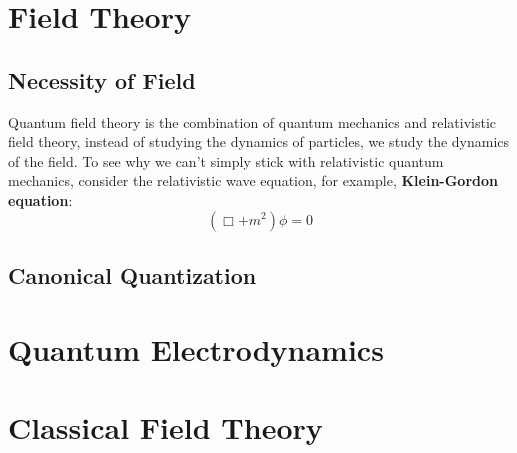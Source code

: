 \documentclass[12pt]{article}
\numberwithin{equation}{section}
\theoremstyle{1style}
\newcommand{\tbf}[1]{\textbf{#1}}
\begin{document}
\newpage





\section{Field Theory}
\subsection{Necessity of Field}
Quantum field theory is the combination of quantum mechanics and relativistic field theory, 
instead of studying the dynamics of particles, we study the dynamics of the field.
To see why we can't simply stick with relativistic quantum mechanics, consider the relativistic 
wave equation, for example, \tbf{Klein-Gordon equation}:
\begin{equation}
  (\Box +m^2)\phi=0
\end{equation}



\subsection{Canonical Quantization}

\section{Quantum Electrodynamics}


\newpage
\appendix
{}

\section{Classical Field Theory}



\newpage
\end{document}
